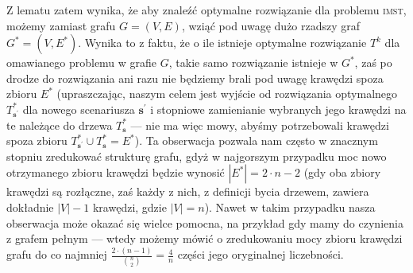 Z lematu zatem wynika, że aby znaleźć optymalne rozwiązanie dla problemu \textsc{imst}, możemy zamiast grafu $G = \left( V, E \right)$, wziąć pod uwagę dużo rzadszy graf $G^{\ast} = \left( V, E^{\ast} \right)$. Wynika to z faktu, że o ile istnieje optymalne rozwiązanie $T^{k}$ dla omawianego problemu w grafie $G$, takie samo rozwiązanie istnieje w $G^{\ast}$, zaś po drodze do rozwiązania ani razu nie będziemy brali pod uwagę krawędzi spoza zbioru $E^{\ast}$ (upraszczając, naszym celem jest wyjście od rozwiązania optymalnego $T^{\ast}_{\textbf{s}^{\prime}}$ dla nowego scenariusza $\textbf{s}^{\prime}$ i stopniowe zamienianie wybranych jego krawędzi na te należące do drzewa $T^{\ast}_{\textbf{s}}$ --- nie ma więc mowy, abyśmy potrzebowali krawędzi spoza zbioru $T^{\ast}_{\textbf{s}^{\prime}} \cup T^{\ast}_{\textbf{s}} = E^{\ast}$). Ta obserwacja pozwala nam często w znacznym stopniu zredukować strukturę grafu, gdyż w najgorszym przypadku moc nowo otrzymanego zbioru krawędzi będzie wynosić $\left| E^{\ast} \right| = 2 \cdot n - 2$ (gdy oba zbiory krawędzi są rozłączne, zaś każdy z nich, z definicji bycia drzewem, zawiera dokładnie $\left| V \right| - 1$ krawędzi, gdzie $\left| V \right| = n$). Nawet w takim przypadku nasza obserwacja może okazać się wielce pomocna, na przykład gdy mamy do czynienia z grafem pełnym --- wtedy możemy mówić o zredukowaniu mocy zbioru krawędzi grafu do co najmniej $\frac{2 \cdot \left( n - 1 \right)}{\binom{n}{2}} = \frac{4}{n}$ części jego oryginalnej liczebności.

